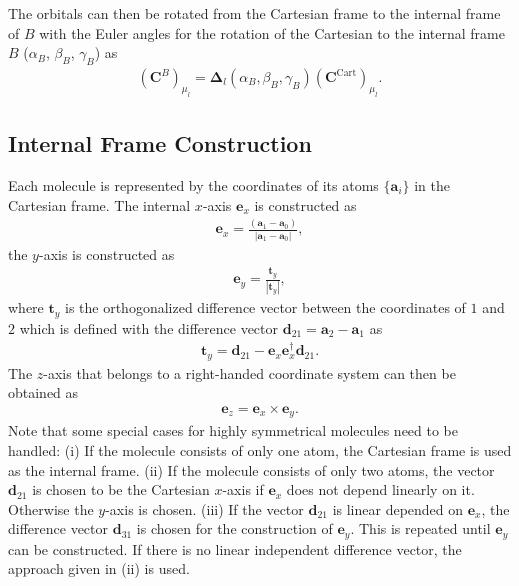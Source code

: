 The orbitals can then be rotated from the Cartesian frame to the internal frame of $B$ with the Euler angles
for the rotation of the Cartesian to the internal frame $B$ ($\alpha_B$, $\beta_B$, $\gamma_B$) as
\begin{align}
  \left(\pmb{C}^B\right)_{\mu_l} = \pmb{\Delta}_l(\alpha_B,\beta_B,\gamma_B)\left(\pmb{C}^\mathrm{Cart}\right)_{\mu_l}.
\end{align}

\subsection{Internal Frame Construction}

Each molecule is represented by the coordinates of its atoms $\{\pmb{a}_i\}$ in the Cartesian frame.
The internal $x$-axis $\pmb{e}_x$ is constructed as
\begin{align}
  \pmb{e}_x = \frac{(\pmb{a}_1-\pmb{a}_0)}{|\pmb{a}_1-\pmb{a}_0|},
\end{align}
the $y$-axis is constructed as
\begin{align}
  \pmb{e}_y = \frac{\pmb{t}_y}{|\pmb{t}_y|},
\end{align}
where $\pmb{t}_y$ is the orthogonalized difference vector between the coordinates of $1$ and $2$
which is defined with the difference vector $\pmb{d}_{21} = \pmb{a}_2-\pmb{a}_1$ as
\begin{align}
  \pmb{t}_y = \pmb{d}_{21}-\pmb{e}_x\pmb{e}_x^\dagger\pmb{d}_{21}.
\end{align}
The $z$-axis that belongs to a right-handed coordinate system can then be obtained as
\begin{align}
  \pmb{e}_z = \pmb{e}_x \times \pmb{e}_y.
\end{align}
Note that some special cases for highly symmetrical molecules need to be handled:
(i)   If the molecule consists of only one atom, the Cartesian frame is used as the internal frame.
(ii)  If the molecule consists of only two atoms, the vector $\pmb{d}_{21}$ is chosen to be the Cartesian
      $x$-axis if $\pmb{e}_x$ does not depend linearly on it. Otherwise the $y$-axis is chosen.
(iii) If the vector $\pmb{d}_{21}$ is linear depended on $\pmb{e}_x$, the difference vector $\pmb{d}_{31}$ is
      chosen for the construction of $\pmb{e}_y$. This is repeated until $\pmb{e}_y$ can be constructed. If there
      is no linear independent difference vector, the approach given in (ii) is used.
